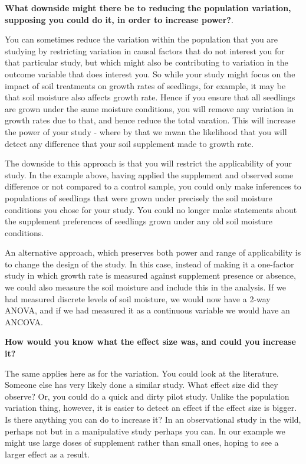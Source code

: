 \documentclass[
  letterpaper,
  DIV=11,
  numbers=noendperiod]{scrreprt}
\begin{document}
\textbf{What downside might there be to reducing the population
variation, supposing you could do it, in order to increase power?}.

You can sometimes reduce the variation within the population that you
are studying by restricting variation in causal factors that do not
interest you for that particular study, but which might also be
contributing to variation in the outcome variable that does interest
you. So while your study might focus on the impact of soil treatments on
growth rates of seedlings, for example, it may be that soil moisture
also affects growth rate. Hence if you ensure that all seedlings are
grown under the same moisture conditions, you will remove any variation
in growth rates due to that, and hence reduce the total varation. This
will increase the power of your study - where by that we mwan the
likelihood that you will detect any difference that your soil supplement
made to growth rate.

The downside to this approach is that you will restrict the
applicability of your study. In the example above, having applied the
supplement and observed some difference or not compared to a control
sample, you could only make inferences to populations of seedlings that
were grown under precisely the soil moisture conditions you chose for
your study. You could no longer make statements about the supplement
preferences of seedlings grown under any old soil moisture conditions.

An alternative approach, which preserves both power and range of
applicability is to change the design of the study. In this case,
instead of making it a one-factor study in which growth rate is measured
against supplement presence or absence, we could also measure the soil
moisture and include this in the analysis. If we had measured discrete
levels of soil moisture, we would now have a 2-way ANOVA, and if we had
measured it as a continuous variable we would have an ANCOVA.

\textbf{How would you know what the effect size was, and could you
increase it?}

The same applies here as for the variation. You could look at the
literature. Someone else has very likely done a similar study. What
effect size did they observe? Or, you could do a quick and dirty pilot
study. Unlike the population variation thing, however, it is easier to
detect an effect if the effect size is bigger. Is there anything you can
do to increase it? In an observational study in the wild, perhaps not
but in a manipulative study perhaps you can. In our example we might use
large doses of supplement rather than small ones, hoping to see a larger
effect as a result.
\end{document}
